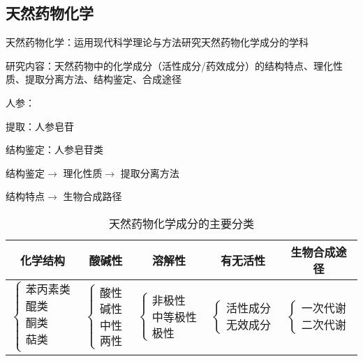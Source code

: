 \subsection{天然药物化学}%
\label{sub:天然药物化学}
\begin{defi}
    天然药物化学：运用现代科学理论与方法研究天然药物化学成分的学科
\end{defi}
研究内容：天然药物中的化学成分（活性成分/药效成分）的结构特点、理化性质、提取分离方法、结构鉴定、合成途径
\begin{eg}
    人参：

    提取：人参皂苷

    结构鉴定：人参皂苷类

    结构鉴定$\to$ 理化性质$\to$ 提取分离方法
    
    结构特点$\to$ 生物合成路径
\end{eg}
\begin{table*}[htpb]
    \centering
    \caption{天然药物化学成分的主要分类}
    \label{tab:天然药物化学成分的主要分类}
    \begin{tabular}{ccccc}
    \toprule
    化学结构 & 酸碱性 & 溶解性 & 有无活性 & 生物合成途径\\
    \midrule
    $\begin{cases}
        \text{苯丙素类}\\ 
        \text{醌类}\\ 
        \text{酮类}\\ 
        \text{萜类}\\ 
    \end{cases}$ & $\begin{cases}
        \text{酸性}\\ 
        \text{碱性}\\ 
        \text{中性}\\ 
        \text{两性}
    \end{cases}$ & $\begin{cases}
        \text{非极性}\\ 
        \text{中等极性}\\ 
        \text{极性}
    \end{cases}$ & $\begin{cases}
        \text{活性成分}\\ 
        \text{无效成分}
    \end{cases}$ & $\begin{cases}
        \text{一次代谢}\\ 
        \text{二次代谢}
    \end{cases}$ \\
    \bottomrule
    \end{tabular}
\end{table*}
